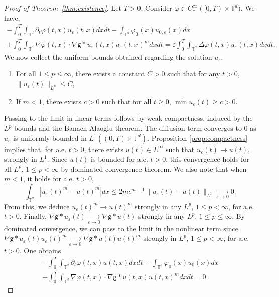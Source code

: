 \documentclass[11pt]{article}
\numberwithin{equation}{section} %
\newcommand{\p}{{\partial}}
\newcommand{\T}{{\mathbb{T}}}
\newcommand{\g}{{\mathsf{g}}}
\newcommand{\eps}{\varepsilon}
\newcommand{\D}{\Delta}
\newcommand{\ep}{\varepsilon}
\def \ep{\varepsilon}
\def\nab{\nabla}
\begin{document}
\begin{proof}[Proof of Theorem~\ref{thm:existence}]


Let $T>0$. Consider $\varphi \in C_c^\infty([0,T)\times\T^d)$. We have, 
\begin{multline*}
    -\int_0^T\int_{\T^d} \p_t\varphi(t,x) u_\ep(t,x) dxdt - \int_{\T^d} \varphi_0(x)u_{0,\ep}(x)dx \\
    + \int_0^T\int_{\T^d} \nab\varphi(t,x)\cdot\nab\g\ast u_\ep(t,x) u_\ep(t,x)^m dxdt 
    = \ep \int_0^T\int_{\T^d} \D\varphi(t,x) u_\ep(t,x)dxdt.
\end{multline*}
We now collect the uniform bounds obtained regarding the solution $u_\ep$:
\begin{enumerate}[label=(\roman*).]
    \item For all $1\le p \le \infty$, there exists a constant $C>0$ such that for any $t>0$, $\|u_\ep(t)\|_{L^p} \le C$,
    \item If $m<1$, there exists $c>0$ such that for all $t\ge 0$, $\min u_\ep(t)\ge c>0$.
\end{enumerate}
Passing to the limit in linear terms follows by weak compactness, induced by the $L^{p}$ bounds and the Banach-Alaoglu theorem. The diffusion term converges to 0 as $u_{\eps}$ is uniformly bounded in $L^{1}((0,T)\times\T^d)$.
Proposition \ref{prop:compactness} implies that, for a.e. $t>0$, there exists $u(t) \in  L^\infty$ such that $u_\ep(t)\to u(t)$, strongly in $L^1$. Since $u(t)$ is bounded for a.e. $t>0$, this convergence holds for all $L^p$, $1\le p<\infty$ by dominated convergence theorem. We also note that when $m<1$, it holds for a.e. $t>0$,
\begin{equation*}
    \int_{\T^d} |u_\ep(t)^m-u(t)^m|dx \le 2mc^{m-1} \|u_\ep(t)-u(t)\|_{L^1}\xrightarrow[\ep\to 0]{}0.
\end{equation*}
From this, we deduce $u_\ep(t)^m\to u(t)^m$ strongly in any $L^p$, $1\le p < \infty$, for a.e. $t>0$.
Finally, $\nab\g\ast u_\ep(t) \xrightarrow[\ep\to 0]{}\nab\g\ast u(t)$ strongly in any $L^p$, $1\le p\le \infty$.  By dominated convergence, we can pass to the limit in the nonlinear term since
$\nab\g\ast u_\ep(t)u_\ep(t)^m \xrightarrow[\ep\to 0]{} \nab\g\ast u(t) u(t)^m$ strongly in $L^p$, $1\le p<\infty$, for a.e. $t>0$. One obtains
\begin{multline*}
    -\int_0^T\int_{\T^d} \p_t\varphi(t,x) u(t,x) dxdt - \int_{\T^d} \varphi_0(x)u_{0}(x)dx \\
    + \int_0^T\int_{\T^d} \nab\varphi(t,x)\cdot\nab\g\ast u(t,x) u(t,x)^m dxdt=0.
\end{multline*}

\end{proof}
\end{document}
